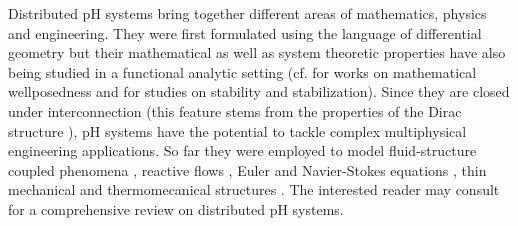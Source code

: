 \documentclass{elsarticle}
\begin{document}
Distributed pH systems bring together different areas of mathematics, physics and engineering. They were first formulated using the language of differential geometry but their mathematical as well as system theoretic properties have also being studied in a functional analytic setting (cf.  \cite{legorrec2005,villegas2007port,skrepek2021,birgit2021riesz} for works on mathematical wellposedness and \cite{ramirez2014exponential,augner2014stability} for studies on stability and stabilization). Since they are closed under interconnection (this feature stems from the properties of the Dirac structure \cite{cervera2007int}), pH systems have the potential to tackle complex multiphysical engineering applications.  So far they were employed to model fluid-structure coupled phenomena \cite{cardoso2017}, reactive flows \cite{altmann2017reactive},  Euler and Navier-Stokes equations \cite{rashad2021part1,rashad2021part2,califano2021ns}, thin mechanical and thermomecanical structures \cite{brugnoli2020,brugnoli2021thermo}. The interested reader may consult \cite{rashad2020review} for a comprehensive review on distributed pH systems. \\
\end{document}
